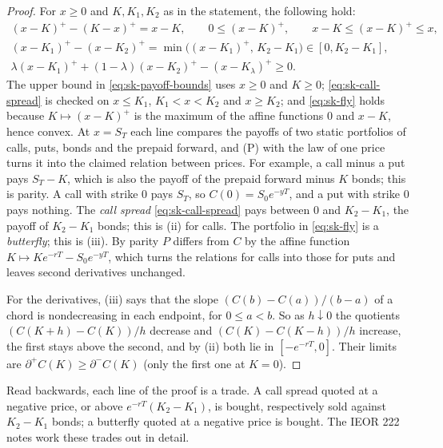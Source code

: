 \begin{proof}
For $x\ge0$ and $K,K_1,K_2$ as in the statement, the following hold:
\begin{gather}
  (x-K)^+-(K-x)^+=x-K,\qquad 0\le(x-K)^+,\qquad x-K\le(x-K)^+\le x,\label{eq:sk-payoff-bounds}\\
  (x-K_1)^+-(x-K_2)^+=\min\big((x-K_1)^+,\,K_2-K_1\big)\in[0,K_2-K_1],\label{eq:sk-call-spread}\\
  \lambda(x-K_1)^++(1-\lambda)(x-K_2)^+-(x-K_\lambda)^+\ge0 .\label{eq:sk-fly}
\end{gather}
The upper bound in \eqref{eq:sk-payoff-bounds} uses $x\ge0$ and $K\ge0$; \eqref{eq:sk-call-spread}
is checked on $x\le K_1$, $K_1<x<K_2$ and $x\ge K_2$; and \eqref{eq:sk-fly} holds because
$K\mapsto(x-K)^+$ is the maximum of the affine functions $0$ and $x-K$, hence convex. At $x=S_T$
each line compares the payoffs of two static portfolios of calls, puts, bonds and the prepaid
forward, and (P) with the law of one price turns it into the claimed relation between prices.
For example, a call minus a put pays $S_T-K$, which is also the payoff of the prepaid forward
minus $K$ bonds; this is parity. A call with strike $0$ pays $S_T$, so $C(0)=S_0e^{-yT}$, and a put
with strike $0$ pays nothing. The \emph{call spread} \eqref{eq:sk-call-spread} pays between $0$
and $K_2-K_1$, the payoff of $K_2-K_1$ bonds; this is (ii) for calls. The portfolio in
\eqref{eq:sk-fly} is a \emph{butterfly}; this is (iii). By parity $P$ differs from $C$ by the
affine function $K\mapsto Ke^{-rT}-S_0e^{-yT}$, which turns the relations for calls into those for
puts and leaves second derivatives unchanged.

For the derivatives, (iii) says that the slope $(C(b)-C(a))/(b-a)$ of a chord is nondecreasing in
each endpoint, for $0\le a<b$. So as $h\downarrow0$ the quotients $(C(K+h)-C(K))/h$ decrease and
$(C(K)-C(K-h))/h$ increase, the first stays above the second, and by (ii) both lie in $[-e^{-rT},0]$.
Their limits are $\partial^+C(K)\ge\partial^-C(K)$ (only the first one at $K=0$).
\end{proof}

Read backwards, each line of the proof is a trade. A call spread quoted at a negative price, or
above $e^{-rT}(K_2-K_1)$, is bought, respectively sold against $K_2-K_1$ bonds; a butterfly quoted
at a negative price is bought. The IEOR 222 notes work these trades out in detail.

